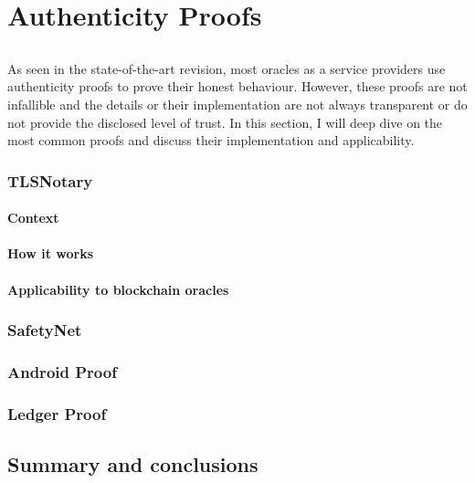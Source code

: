 \chapter{Authenticity Proofs}\label{chap:chap4}

\section*{}
As seen in the state-of-the-art revision, most oracles as a service providers use authenticity proofs to prove their honest behaviour. However, these proofs are not infallible and the details or their implementation are not always transparent or do not provide the disclosed level of trust. In this section, I will deep dive on the most common proofs and discuss their implementation and applicability.


\subsection{TLSNotary}
\subsubsection{Context}


\subsubsection{How it works}

\subsubsection{Applicability to blockchain oracles}

\subsection{SafetyNet}

\subsection{Android Proof}

\subsection{Ledger Proof}

\section{Summary and conclusions}
